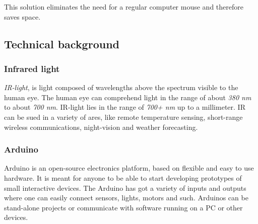 \documentclass[a4paper,11pt]{article}
\begin{document}
This solution eliminates the need for a regular computer mouse and therefore saves space.\\

\subsection{Technical background}

\subsubsection{Infrared light}

\emph{IR-light}, is light composed of wavelengths above the spectrum visible to
the human eye. The human eye can comprehend light in the range of about \emph{380 nm} to about
\emph{700 nm}. IR-light lies in the range of \emph{700+ nm} up to a millimeter.
IR can be sued in a variety of ares, like remote temperature sensing, short-range wireless
communications, night-vision and weather forecasting.

\subsubsection{Arduino}
Arduino is an open-source electronics platform, based on flexible and easy to use hardware.
It is meant for anyone to be able to start developing prototypes of small interactive devices.
The Arduino has got a variety of inputs and outputs where one can easily connect sensors, 
lights, motors and such. Arduinos can be stand-alone projects or communicate with 
software running on a PC or other devices.
\end{document}
